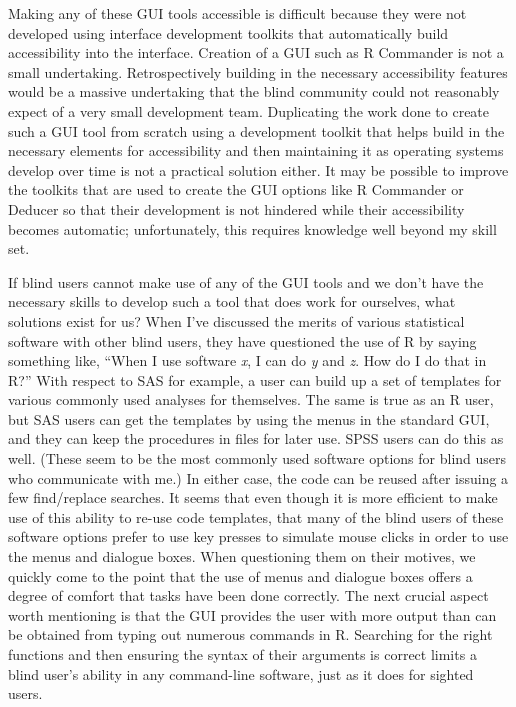 \documentclass[
]{book}
\begin{document}
Making any of these GUI tools accessible is
difficult because they were not developed using interface development toolkits that automatically build accessibility into the interface.
Creation of a GUI such as R Commander is not a small undertaking. Retrospectively building in the necessary accessibility features would be a massive undertaking that the blind community could not reasonably expect of a very small development team. Duplicating the work done to create such a GUI tool from scratch using a development toolkit that helps build in the necessary elements for accessibility and then maintaining it as operating systems develop over time is not a practical solution either. It may be possible to improve the toolkits that are used to create the GUI options like R Commander or Deducer so that their development is not hindered while their accessibility becomes automatic; unfortunately, this requires knowledge well beyond my skill set.

If blind users cannot make use of any of the GUI tools and we don't have the necessary skills to develop such a tool that does work for ourselves, what solutions exist for us? When I've discussed the merits of various statistical software with other blind users, they have questioned the use of R by saying something like, ``When I use software \emph{x}, I can do \emph{y} and \emph{z}. How do I do that in R?'' With respect to SAS for example, a user can build up a set of templates for various commonly used analyses for themselves. The same is true as an R user, but SAS users can get the templates by using the menus in the standard GUI, and they can keep the procedures in files for later use. SPSS users can do this as well. (These seem to be the most commonly used software options for blind users who communicate with me.) In either case, the code can be reused after issuing a few find/replace searches. It seems that even though it is more efficient to make use of this ability to re-use code templates, that many of the blind users of these software options prefer to use key presses to simulate mouse clicks in order to use the menus and dialogue boxes. When questioning them on their motives, we quickly come to the point that the use of menus and dialogue boxes offers a degree of comfort that tasks have been done correctly. The next crucial aspect worth mentioning is that the GUI provides the user with more output than can be obtained from typing out numerous commands in R. Searching for the right functions and then ensuring the syntax of their arguments is correct limits a blind user's ability in any command-line software, just as it does for sighted users.
\end{document}
